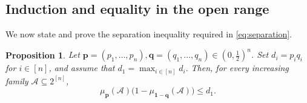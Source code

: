 \documentclass[11pt]{article}
\numberwithin{equation}{section}
\newtheorem{proposition}[theorem]{Proposition}
\theoremstyle{definition}
\theoremstyle{remark}
\begin{document}
\subsection{Induction and equality in the open range}
\label{sec:product-proof}

We now state and prove the separation inequality required in
\eqref{eq:separation}.

\begin{proposition}\label{prop:separation}
Let $\mathbf p=(p_1,\ldots,p_n), \mathbf q=(q_1,\ldots,q_n)\in(0,\frac{1}{2})^n$. Set $d_i=p_iq_i$ for
$i\in[n]$, and assume that
$
 d_1=\max_{i\in[n]}d_i.
$
Then, for every increasing family
$\mathcal{A}\subseteq2^{[n]}$,
\begin{equation*}
 \mu_{\mathbf p}(\mathcal{A})
 \bigl(1-\mu_{\mathbf 1-\mathbf q}(\mathcal{A})\bigr)
 \leq d_1.
\end{equation*}
\end{proposition}
\end{document}
